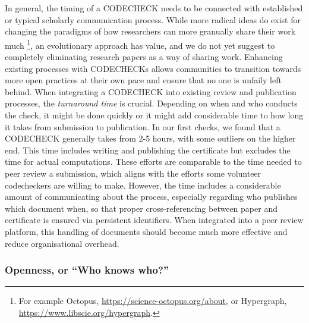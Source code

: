 \documentclass[12pt]{article}
\begin{document}
In general, the timing of a CODECHECK needs to be connected with 
established or typical scholarly communication process.
While more radical ideas do exist for changing the paradigms of how researchers can more granually share their work much
\footnote{For example Octopus, \url{https://science-octopus.org/about}, or Hypergraph, \url{https://www.libscie.org/hypergraph}.},
an evolutionary approach has value, and we do not yet suggest to completely eliminating research papers as a way of sharing work.
Enhancing existing processes with CODECHECKs allows communities to transition towards more open practices at their own pace and ensure that no one is unfaily left behind.
When integrating a CODECHECK into existing review and publication processes, the \emph{turnaround time} is crucial.
Depending on when and who conducts the check, it might be done quickly or it might add considerable time to how long it takes from submission to publication.
In our first checks, we found that a CODECHECK generally takes from 2-5 hours, with some outliers on the higher end.
This time includes writing and publishing the certificate but excludes the time for actual computations.
These efforts are comparable to the time needed to peer review a submission,
which aligns with the efforts some volunteer codecheckers are willing to
make.
However, the time includes a considerable amount of communicating about the
process, especially regarding who publishes which document when, so that proper
cross-referencing between paper and certificate is ensured via persistent
identifiers.
When integrated into a peer review platform, this handling of documents should
become much more effective and reduce organisational overhead.

\subsubsection*{Openness, or ``Who knows who?''}\label{who-knows-who}
\end{document}
